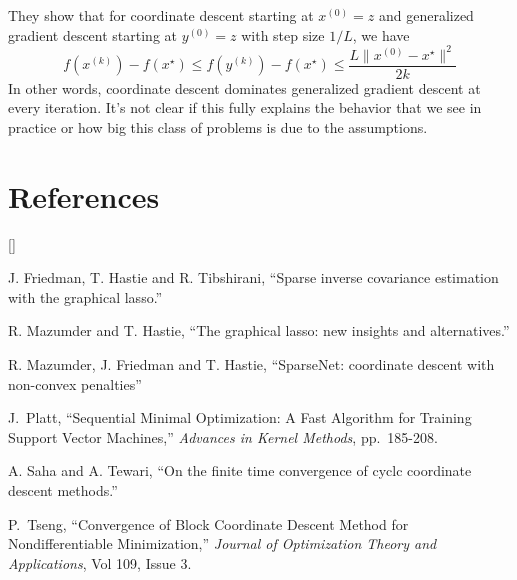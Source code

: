 \documentclass[twoside]{article}
\def\beginrefs{\begin{list}%
        {[\arabic{equation}]}{\usecounter{equation}
         \setlength{\leftmargin}{2.0truecm}\setlength{\labelsep}{0.4truecm}%
         \setlength{\labelwidth}{1.6truecm}}}
\def\endrefs{\end{list}}
\def\bibentry#1{\item[\hbox{[#1]}]}
\begin{document}
They show that for coordinate descent starting at $x^{(0)} = z$ and generalized gradient descent starting at $y^{(0)} = z$ with step size $1/L$, we have
\begin{equation*}
f(x^{(k)}) - f(x^\star) \le f(y^{(k)}) - f(x^\star) \le \frac{L\|x^{(0)} - x^\star\|^2}{2k}
\end{equation*}
In other words, coordinate descent dominates generalized gradient descent at every iteration. It's not clear if this fully explains the behavior that we see in practice or how big this class of problems is due to the assumptions.

\section*{References}
\beginrefs
\bibentry{FHT07} J. Friedman, T. Hastie and R. Tibshirani, ``Sparse inverse covariance estimation with the graphical lasso.''
\bibentry{MH11} R. Mazumder and T. Hastie, ``The graphical lasso: new insights and alternatives.''
\bibentry{MFH11} R. Mazumder, J. Friedman and T. Hastie, ``SparseNet: coordinate descent with non-convex penalties''
\bibentry{P98} J.~Platt, ``Sequential Minimal Optimization: A Fast Algorithm for Training Support Vector Machines,'' {\it Advances in Kernel Methods}, pp.~185-208.
\bibentry{ST10} A. Saha and A. Tewari, ``On the finite time convergence of cyclc coordinate descent methods.''
\bibentry{T01} P.~Tseng, ``Convergence of Block Coordinate Descent Method for Nondifferentiable Minimization,'' {\it Journal of Optimization Theory and Applications}, Vol 109, Issue 3.
\endrefs

\end{document}
